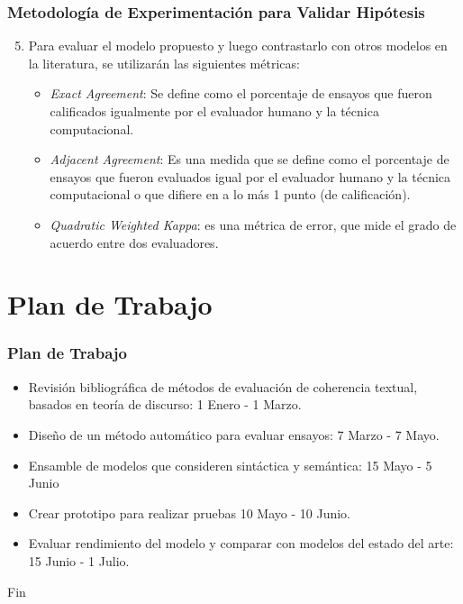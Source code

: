 \documentclass{beamer}
\begin{document}
\begin{frame}
\frametitle{Metodología de Experimentación para Validar Hipótesis}
\begin{enumerate}
\setcounter{enumi}{4}
\item Para evaluar el modelo propuesto y luego contrastarlo con otros modelos en la literatura,
se utilizarán las siguientes métricas:
\begin{itemize}
	\item {\em Exact Agreement}: Se define como el porcentaje de ensayos que fueron calificados igualmente
por el evaluador humano y la técnica computacional.
	\item {\em Adjacent Agreement}: Es una medida que se define como el porcentaje de ensayos que fueron evaluados igual por el evaluador humano y la técnica computacional o que difiere en a lo más 1 punto (de calificación).
	\item {\em Quadratic Weighted Kappa}: es una métrica de error, que mide el grado de acuerdo entre dos evaluadores.
\end{itemize}
\end{enumerate}

\end{frame}

\section{Plan de Trabajo}
\begin{frame}
\frametitle{Plan de Trabajo}
\begin{itemize}
\item Revisión bibliográfica de métodos de evaluación de coherencia textual, basados en teoría de discurso: 1 Enero - 1 Marzo.
\item Diseño de un método automático para evaluar ensayos: 7 Marzo - 7 Mayo.
\item Ensamble de modelos que consideren sintáctica y semántica: 15 Mayo - 5 Junio
\item Crear prototipo para realizar pruebas 10 Mayo - 10 Junio.
\item Evaluar rendimiento del modelo y comparar con modelos del estado del arte: 15 Junio - 1
Julio.
\end{itemize}
\end{frame}


\begin{frame}
\Huge{\centerline{Fin}}
\end{frame}

\end{document}
